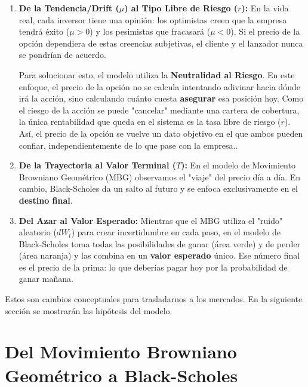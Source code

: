 \documentclass[11pt]{article}
\newcommand{\comillas}[1]{"#1"} %
\begin{document}
		\begin{enumerate}		
			\item \textbf{De la Tendencia/Drift ($\mu$) al Tipo Libre de Riesgo ($r$):} 
			En la vida real, cada inversor tiene una opinión: los optimistas creen que la empresa tendrá éxito ($\mu > 0$) y los pesimistas que fracasará ($\mu < 0$). Si el precio de la opción dependiera de estas creencias subjetivas, el cliente y el lanzador nunca se pondrían de acuerdo. 
					
			Para solucionar esto, el modelo utiliza la \textbf{Neutralidad al Riesgo}. En este enfoque, el precio de la opción no se calcula intentando adivinar hacia dónde irá la acción, sino calculando cuánto cuesta \textbf{asegurar} esa posición hoy. Como el riesgo de la acción se puede \comillas{cancelar} mediante una cartera de cobertura, la única rentabilidad que queda en el sistema es la tasa libre de riesgo ($r$). Así, el precio de la opción se vuelve un dato objetivo en el que ambos pueden confiar, independientemente de lo que pase con la empresa..
					
			\item \textbf{De la Trayectoria al Valor Terminal ($T$):} 
			En el modelo de Movimiento Browniano Geométrico (MBG) observamos el "viaje" del precio día a día. En cambio, Black-Scholes da un salto al futuro y se enfoca exclusivamente en el \textbf{destino final}.
					
			\item \textbf{Del Azar al Valor Esperado:} 
			Mientras que el MBG utiliza el \comillas{ruido} aleatorio ($dW_t$) para crear incertidumbre en cada paso, en el modelo de Black-Scholes toma todas las posibilidades de ganar (área verde) y de perder (área naranja) y las combina en un \textbf{valor esperado} único. Ese número final es el precio de la prima: lo que deberías pagar hoy por la probabilidad de ganar mañana.
		\end{enumerate}
		
		Estos son cambios conceptuales para trasladarnos a los mercados. En la siguiente sección se mostrarán las hipótesis del modelo.
	\section{Del Movimiento Browniano Geométrico a Black-Scholes}
\end{document}
